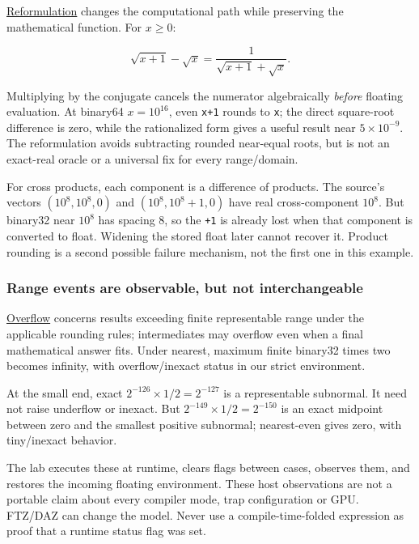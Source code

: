 \hyperref[appendix-d7f8ba961670]{Reformulation} changes the computational path while preserving the mathematical function. For \(x\ge0\):

\[
\sqrt{x+1}-\sqrt{x}
=\frac{1}{\sqrt{x+1}+\sqrt{x}}.
\]

Multiplying by the conjugate cancels the numerator algebraically \emph{before} floating evaluation. At binary64 \(x=10^{16}\), even \texttt{x+1} rounds to \texttt{x}; the direct square-root difference is zero, while the rationalized form gives a useful result near \(5\times10^{-9}\). The reformulation avoids subtracting rounded near-equal roots, but is not an exact-real oracle or a universal fix for every range/domain.

For cross products, each component is a difference of products. The source's vectors \((10^8,10^8,0)\) and \((10^8,10^8+1,0)\) have real cross-component \(10^8\). But binary32 near \(10^8\) has spacing 8, so the \texttt{+1} is already lost when that component is converted to float. Widening the stored float later cannot recover it. Product rounding is a second possible failure mechanism, not the first one in this example.

\subsubsection{Range events are observable, but not interchangeable}\label{01-foundations-i-ch001-range-events-are-observable-but-not-interchangeable}

\hypertarget{01-foundations-i-ch001-range-events-are-observable-but-not-interchangeable}{}

\hyperref[appendix-ed8531b46754]{Overflow} concerns results exceeding finite representable range under the applicable rounding rules; intermediates may overflow even when a final mathematical answer fits. Under nearest, maximum finite binary32 times two becomes infinity, with overflow/inexact status in our strict environment.

At the small end, exact \(2^{-126}\times1/2=2^{-127}\) is a representable subnormal. It need not raise underflow or inexact. But \(2^{-149}\times1/2=2^{-150}\) is an exact midpoint between zero and the smallest positive subnormal; nearest-even gives zero, with tiny/inexact behavior.

The lab executes these at runtime, clears flags between cases, observes them, and restores the incoming floating environment. These host observations are not a portable claim about every compiler mode, trap configuration or GPU. FTZ/DAZ can change the model. Never use a compile-time-folded expression as proof that a runtime status flag was set.

